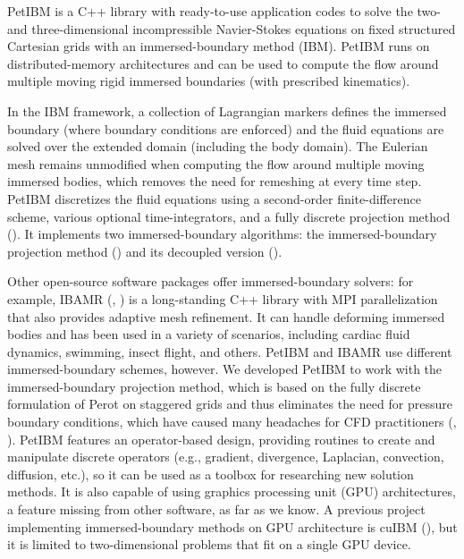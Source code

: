 PetIBM is a C++ library with ready-to-use application codes to solve the two- and three-dimensional incompressible Navier-Stokes equations on fixed structured Cartesian grids with an immersed-boundary method (IBM).
PetIBM runs on distributed-memory architectures and can be used to compute the flow around multiple moving rigid immersed boundaries (with prescribed kinematics).

In the IBM framework, a collection of Lagrangian markers defines the immersed boundary (where boundary conditions are enforced) and the fluid equations are solved over the extended domain (including the body domain).
The Eulerian mesh remains unmodified when computing the flow around multiple moving immersed bodies, which removes the need for remeshing at every time step.
PetIBM discretizes the fluid equations using a second-order finite-difference scheme, various optional time-integrators, and a fully discrete projection method (\cite{perot_1993}).
It implements two immersed-boundary algorithms: the immersed-boundary projection method (\cite{taira_colonius_2007}) and its decoupled version (\cite{li_et_al_2016}).

Other open-source software packages offer immersed-boundary solvers: for example, IBAMR (\cite{griffith_et_al_2007}, \cite{bhalla_et_al_2013}) is a long-standing C++ library with MPI parallelization that also provides adaptive mesh refinement.
It can handle deforming immersed bodies and has been used in a variety of scenarios, including cardiac fluid dynamics, swimming, insect flight, and others.
PetIBM and IBAMR use different immersed-boundary schemes, however. We developed PetIBM to work with the immersed-boundary projection method, which is based on the fully discrete formulation of Perot on staggered grids and thus eliminates the need for pressure boundary conditions, which have caused many headaches for CFD practitioners (\cite{gresho_sani_1987}, \cite{sani_gresho_1994}).
PetIBM features an operator-based design, providing routines to create and manipulate discrete operators (e.g., gradient, divergence, Laplacian, convection, diffusion, etc.), so it can be used as a toolbox for researching new solution methods.
It is also capable of using graphics processing unit (GPU) architectures, a feature missing from other software, as far as we know.
A previous project implementing immersed-boundary methods on GPU architecture is cuIBM (\cite{krishnan_et_al_2017}), but it is limited to two-dimensional problems that fit on a single GPU device.

